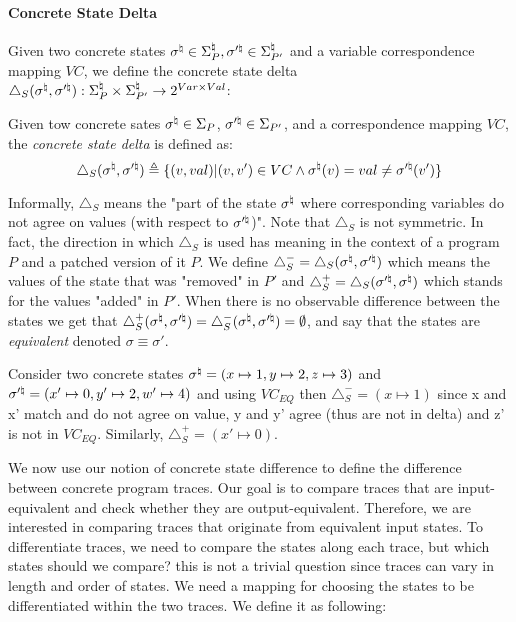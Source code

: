 \paragraph{Concrete State Delta} 
Given two concrete states $\sigma^\natural \in \Sigma_{P}^\natural,\sigma'^\natural \in \Sigma_{P'}^\natural$ and a variable correspondence mapping $VC$, we define the concrete state delta $\triangle_{S}(\sigma^\natural,\sigma'^\natural) : \Sigma^\natural_{P} \times \Sigma^\natural_{P'} \rightarrow 2^{Var \times Val}$:

\begin{definition}
Given tow concrete sates $\sigma^\natural \in \Sigma_{P}$, $\sigma'^\natural \in \Sigma_{P'}$, and a correspondence mapping $VC$, the \emph{concrete state delta} is defined as:
\[
\triangle_{S}(\sigma^\natural,\sigma'^\natural) \triangleq \{ (v,val) | (v,v') \in VC \wedge \sigma^\natural(v) = val \neq \sigma'^\natural(v')\}
\]
\end{definition}
Informally, $\triangle_{S}$ means the "part of the state $\sigma^\natural$ where corresponding variables do not agree on values (with respect to $\sigma'^\natural$)". Note that $\triangle_{S}$ is not symmetric. In fact, the direction in which $\triangle_{S}$ is used has meaning in the context of a program $P$ and a patched version of it $P$. We define $\triangle_{S}^{-} = \triangle_{S}(\sigma^\natural,\sigma'^\natural)$ which means the values of the state that was "removed" in $P'$ and $\triangle_{S}^{+} = \triangle_{S}(\sigma'^\natural,\sigma^\natural)$ which stands for the values "added" in $P'$. When there is no observable difference between the states we get that $\triangle_{S}^{+}(\sigma^\natural,\sigma'^\natural)= \triangle_{S}^{-}(\sigma^\natural,\sigma'^\natural) = \emptyset$, and say that the states are \emph{equivalent} denoted $\sigma \equiv \sigma'$.

\begin{Example}
Consider two concrete states $\sigma^\natural = (x \mapsto 1,y \mapsto 2,z \mapsto 3)$ and $\sigma'^\natural = (x' \mapsto 0,y' \mapsto 2,w' \mapsto 4)$ and using $VC_{EQ}$ then $\triangle_{S}^{-} = (x \mapsto 1)$ since x and x' match and do not agree on value, y and y' agree (thus are not in delta) and z' is not in $VC_{EQ}$. Similarly, $\triangle_{S}^{+} = (x' \mapsto 0)$. %
\end{Example}

We now use our notion of concrete state difference to define the difference between concrete program traces. Our goal is to compare traces that are input-equivalent and check whether they are output-equivalent.
Therefore, we are interested in comparing traces that originate from equivalent input states. To differentiate traces, we need to compare the states along each trace, but which states should we compare? this is not a trivial question since traces can vary in length and order of states. We need a mapping for choosing the states to be differentiated within the two traces. We define it as following:

